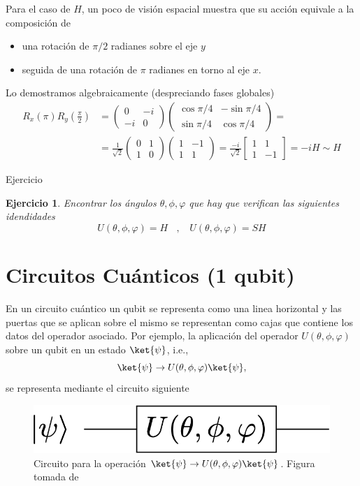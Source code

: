 \documentclass[a4paper,11pt]{book} %
\newtheorem{ejercicio_contador}{Ejercicio}
\newcommand{\Ejercicio}[1]{
		\begin{mybox_gray}{Ejercicio} 
			\begin{ejercicio_contador}
				 #1 
			\end{ejercicio_contador} 
		\end{mybox_gray}
	}
\numberwithin{equation}{chapter}
\def\lp{\left(}
\def\rp{\right)}
\begin{document}
Para el caso de $H$, un poco de visión espacial muestra que su acción equivale a la composición de
\begin{itemize}
	\item una  rotación de $\pi/2$ radianes sobre el eje $y$ 
	\item seguida de una rotación de  $\pi$ radianes en torno al eje $x$.
\end{itemize}
Lo demostramos algebraicamente (despreciando fases globales)       
	\begin{align*}
	R_x(\pi)R_{y}\left(\frac{\pi}{2}\right) & = 
	\lp \begin{matrix}0&-i\\-i&0\end{matrix}  \rp
	\lp \begin{matrix}\cos\pi/4& -\sin\pi/4 \\ \sin\pi/4 & \cos\pi/4 \end{matrix} \rp = \\
	& = \frac{1}{\sqrt{2}} \lp \begin{matrix} 0&1 \\ 1&0 \end{matrix} \rp 
	\lp \begin{matrix}1 & -1 \\ 1 & 1 \end{matrix} \rp  =
	 \frac{-i}{\sqrt{2}} \begin{bmatrix}1&1\\1&-1\end{bmatrix} =-i H \sim H
	\end{align*}

	\Ejercicio{Encontrar los ángulos $\theta,\phi,\varphi$ que hay que verifican las siguientes idendidades
	 $$
	 U(\theta,\phi,\varphi) = H ~~~~,~~~~  U(\theta,\phi,\varphi) = SH
	 $$}

  
    \section{Circuitos Cuánticos (1 qubit)}
    
En un circuito cuántico un qubit se representa como una linea horizontal y las puertas que se aplican sobre 
el mismo se representan como cajas que contiene los datos del operador asociado. Por ejemplo, la aplicación del operador $U(\theta,\phi,\varphi)$ sobre un qubit en un estado $\ket{\psi}$, i.e.,
	\begin{equation*}
	\ket{\psi} \to  U(\theta,\phi,\varphi)\ket{\psi},
	\end{equation*}
se representa mediante el circuito siguiente
	\begin{figure}[H]
	\centering 
	\includegraphics[width=0.3\linewidth]{Figuras/Fig_puertas_simples}
	\caption{Circuito para la operación $\ket{\psi} \to  U(\theta,\phi,\varphi)\ket{\psi}$. Figura tomada de \cite{Curso-JMas}}
	\label{Fig_puertas_simples}
	\end{figure}
	
\end{document}
